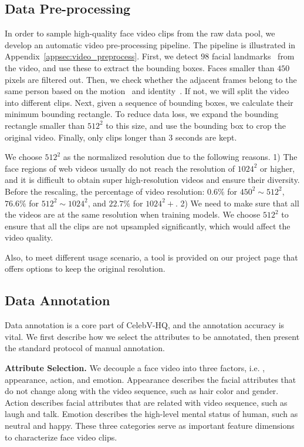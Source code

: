 \subsection{Data Pre-processing}
\label{sec:video_preprocess}
In order to sample high-quality face video clips from the raw data pool, we develop an automatic video pre-processing pipeline. The pipeline is illustrated in Appendix~\ref{appsec:video_preprocess}.
First, we detect $98$ facial landmarks~\cite{wu2018look} from the video, and use these to extract the bounding boxes. Faces smaller than $450$ pixels are filtered out. Then, we check whether the adjacent frames belong to the same person based on the motion~\cite{sort} and identity~\cite{arcface}. If not, we will split the video into different clips. Next, given a sequence of bounding boxes, we calculate their minimum bounding rectangle. To reduce data loss, we expand the bounding rectangle smaller than $512^2$ to this size, and use the bounding box to crop the original video. Finally, only clips longer than 3 seconds are kept.

We choose $512^2$ as the normalized resolution due to the following reasons. 1) The face regions of web videos usually do not reach the resolution of $1024^2$ or higher, and it is difficult to obtain super high-resolution videos and ensure their diversity. Before the rescaling, the percentage of video resolution: $0.6\%$ for $450^2{\sim}512^2$, $76.6\%$ for $512^2{\sim}1024^2$, and $22.7\%$ for $1024^2+$. 2) We need to make sure that all the videos are at the same resolution when training models. We choose $512^2$ to ensure that all the clips are not upsampled significantly, which would affect the video quality.

Also, to meet different usage scenario, a tool is provided on our project page that offers options to keep the original resolution.

\subsection{Data Annotation} Data annotation is a core part of CelebV-HQ, and the annotation accuracy is vital. We first describe how we select the attributes to be annotated, then present the standard protocol of manual annotation.

\textbf{Attribute Selection.} We decouple a face video into three factors, i.e. ,  appearance, action, and emotion. Appearance describes the facial attributes that do not change along with the video sequence, such as hair color and gender. Action describes facial attributes that are related with video sequence, such as laugh and talk. Emotion describes the high-level mental status of human, such as neutral and happy. These three categories serve as important feature dimensions to characterize face video clips.


